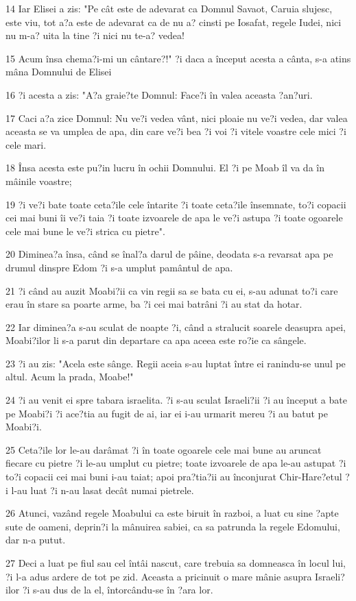 \par 14 Iar Elisei a zis: "Pe cât este de adevarat ca Domnul Savaot, Caruia slujesc, este viu, tot a?a este de adevarat ca de nu a? cinsti pe Iosafat, regele Iudei, nici nu m-a? uita la tine ?i nici nu te-a? vedea!
\par 15 Acum însa chema?i-mi un cântare?!" ?i daca a început acesta a cânta, s-a atins mâna Domnului de Elisei
\par 16 ?i acesta a zis: "A?a graie?te Domnul: Face?i în valea aceasta ?an?uri.
\par 17 Caci a?a zice Domnul: Nu ve?i vedea vânt, nici ploaie nu ve?i vedea, dar valea aceasta se va umplea de apa, din care ve?i bea ?i voi ?i vitele voastre cele mici ?i cele mari.
\par 18 Însa acesta este pu?in lucru în ochii Domnului. El ?i pe Moab îl va da în mâinile voastre;
\par 19 ?i ve?i bate toate ceta?ile cele întarite ?i toate ceta?ile însemnate, to?i copacii cei mai buni îi ve?i taia ?i toate izvoarele de apa le ve?i astupa ?i toate ogoarele cele mai bune le ve?i strica cu pietre".
\par 20 Diminea?a însa, când se înal?a darul de pâine, deodata s-a revarsat apa pe drumul dinspre Edom ?i s-a umplut pamântul de apa.
\par 21 ?i când au auzit Moabi?ii ca vin regii sa se bata cu ei, s-au adunat to?i care erau în stare sa poarte arme, ba ?i cei mai batrâni ?i au stat da hotar.
\par 22 Iar diminea?a s-au sculat de noapte ?i, când a stralucit soarele deasupra apei, Moabi?ilor li s-a parut din departare ca apa aceea este ro?ie ca sângele.
\par 23 ?i au zis: "Acela este sânge. Regii aceia s-au luptat între ei ranindu-se unul pe altul. Acum la prada, Moabe!"
\par 24 ?i au venit ei spre tabara israelita. ?i s-au sculat Israeli?ii ?i au început a bate pe Moabi?i ?i ace?tia au fugit de ai, iar ei i-au urmarit mereu ?i au batut pe Moabi?i.
\par 25 Ceta?ile lor le-au darâmat ?i în toate ogoarele cele mai bune au aruncat fiecare cu pietre ?i le-au umplut cu pietre; toate izvoarele de apa le-au astupat ?i to?i copacii cei mai buni i-au taiat; apoi pra?tia?ii au înconjurat Chir-Hare?etul ?i l-au luat ?i n-au lasat decât numai pietrele.
\par 26 Atunci, vazând regele Moabului ca este biruit în razboi, a luat cu sine ?apte sute de oameni, deprin?i la mânuirea sabiei, ca sa patrunda la regele Edomului, dar n-a putut.
\par 27 Deci a luat pe fiul sau cel întâi nascut, care trebuia sa domneasca în locul lui, ?i l-a adus ardere de tot pe zid. Aceasta a pricinuit o mare mânie asupra Israeli?ilor ?i s-au dus de la el, întorcându-se în ?ara lor.

